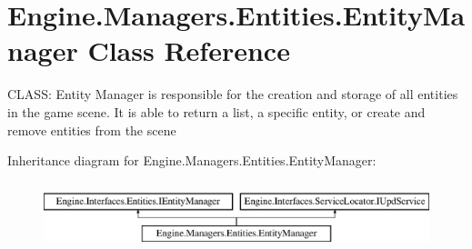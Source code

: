 \hypertarget{a00518}{}\section{Engine.\+Managers.\+Entities.\+Entity\+Manager Class Reference}
\label{a00518}


C\+L\+A\+SS\+: Entity Manager is responsible for the creation and storage of all entities in the game scene. It is able to return a list, a specific entity, or create and remove entities from the scene  


Inheritance diagram for Engine.\+Managers.\+Entities.\+Entity\+Manager\+:\begin{figure}[H]
\begin{center}
\leavevmode
\includegraphics[height=1.978799cm]{d5/dee/a00518}
\end{center}
\end{figure}
